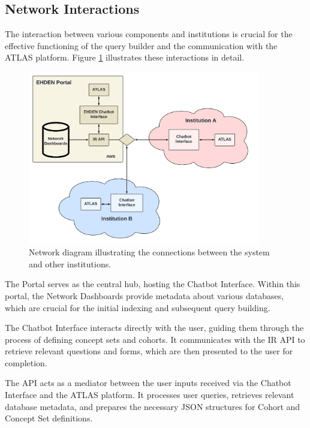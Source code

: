 \subsection{Network Interactions}

The interaction between various components and institutions is crucial for the effective functioning of the query builder and the communication with the ATLAS platform. Figure \ref{fig_network} illustrates these interactions in detail.

\begin{figure}[H]
  \includegraphics[width=0.9\textwidth]{figs/chapter4/network_diagram.png}
  \centering
  \caption{Network diagram illustrating the connections between the system and other institutions.}
  \label{fig_network}
\end{figure}

The {\ehden} Portal serves as the central hub, hosting the {\ehden} Chatbot Interface. Within this portal, the Network Dashboards provide metadata about various databases, which are crucial for the initial indexing and subsequent query building.

The {\ehden} Chatbot Interface interacts directly with the user, guiding them through the process of defining concept sets and cohorts. It communicates with the IR API to retrieve relevant questions and forms, which are then presented to the user for completion.

The {\ir} API acts as a mediator between the user inputs received via the Chatbot Interface and the ATLAS platform. It processes user queries, retrieves relevant database metadata, and prepares the necessary JSON structures for Cohort and Concept Set definitions.

